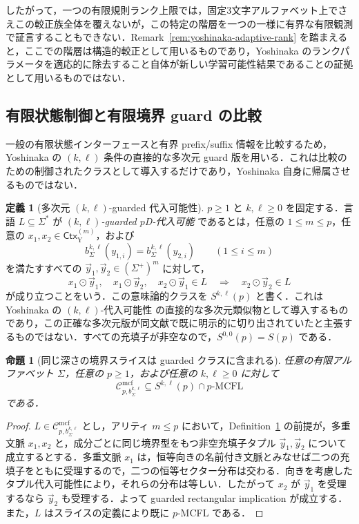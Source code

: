\documentclass[11pt,a4paper]{ltjsarticle}
\numberwithin{equation}{section}
\theoremstyle{plain}
\newtheorem{proposition}[theorem]{命題}
\theoremstyle{definition}
\newtheorem{definition}[theorem]{定義}
\theoremstyle{remark}
\newcommand{\Cmcf}[2]{\mathcal{C}^{\mathrm{mcf}}_{#1,#2}}
\newcommand{\tuple}[1]{\vec{#1}}
\begin{document}
したがって，一つの有限規則ランク上限では，固定3文字アルファベット上でさえこの較正族全体を覆えないが，この特定の階層を一つの一様に有界な有限観測で証言することもできない．Remark~\ref{rem:yoshinaka-adaptive-rank} を踏まえると，ここでの階層は構造的較正として用いるものであり，Yoshinaka のランクパラメータを適応的に除去すること自体が新しい学習可能性結果であることの証拠として用いるものではない．

\subsection{有限状態制御と有限境界 guard の比較}

一般の有限状態インターフェースと有界 prefix/suffix 情報を比較するため，Yoshinaka の $(k,\ell)$ 条件の直接的な多次元 guard 版を用いる．これは比較のための制御されたクラスとして導入するだけであり，Yoshinaka 自身に帰属させるものではない．

\begin{definition}[多次元 \((k,\ell)\)-guarded 代入可能性]
\label{def:guarded-pd-substitutability}
\(p\ge1\) と \(k,\ell\ge0\) を固定する．言語 \(L\subseteq\Sigma^*\) が
\emph{\((k,\ell)\)-guarded \(p\)D-代入可能} であるとは，任意の
\(1\le m\le p\)，任意の \(x_1,x_2\in\mathsf{Ctx}_{\mathrm Y}^{(m)}\)，および
\[
  b_\Sigma^{k,\ell}(y_{1,i})=b_\Sigma^{k,\ell}(y_{2,i})
  \qquad(1\le i\le m)
\]
を満たすすべての \(\tuple y_1,\tuple y_2\in(\Sigma^+)^m\) に対して，
\[
 x_1\odot\tuple y_1,\quad x_1\odot\tuple y_2,\quad
 x_2\odot\tuple y_1\in L
 \quad\Longrightarrow\quad
 x_2\odot\tuple y_2\in L
\]
が成り立つことをいう．この意味論的クラスを \(S^{k,\ell}(p)\) と書く．これは Yoshinaka の \((k,\ell)\)-代入可能性 \cite{Yoshinaka2008} の直接的な多次元類似物として導入するものであり，この正確な多次元版が同文献で既に明示的に切り出されていたと主張するものではない．すべての充填子が非空なので，\(S^{0,0}(p)=S(p)\) である．
\end{definition}

\begin{proposition}[同じ深さの境界スライスは guarded クラスに含まれる]
\label{prop:same-depth-guarded-converse}
任意の有限アルファベット $\Sigma$，任意の $p\ge1$，および任意の $k,\ell\ge0$ に対して
\[
  \Cmcf{p}{b_\Sigma^{k,\ell}}
  \subseteq
  S^{k,\ell}(p)\cap p\text{-}\mathrm{MCFL}
\]
である．
\end{proposition}

\begin{proof}
$L\in\Cmcf{p}{b_\Sigma^{k,\ell}}$ とし，アリティ $m\le p$ において，Definition~\ref{def:guarded-pd-substitutability} の前提が，多重文脈 $x_1,x_2$ と，成分ごとに同じ境界型をもつ非空充填子タプル $\tuple y_1,\tuple y_2$ について成立するとする．多重文脈 $x_1$ は，恒等向きの名前付き文脈とみなせば二つの充填子をともに受理するので，二つの恒等セクター分布は交わる．向きを考慮したタプル代入可能性により，それらの分布は等しい．したがって $x_2$ が $\tuple y_1$ を受理するなら $\tuple y_2$ も受理する．よって guarded rectangular implication が成立する．また，$L$ はスライスの定義により既に $p$-MCFL である．
\end{proof}
\end{document}
